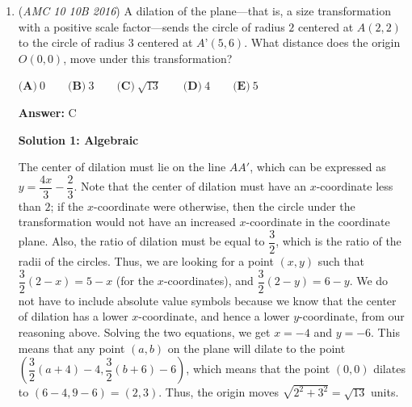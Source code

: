 \begin{enumerate}
We set the points$D(0, 0)$, $A(0, 4)$, $E(4, 4)$, $B(5, 4)$, $G(5, 1)$, $C(5, 0)$, and $F(2, 0)$.The equation of $\overline{AC}$ is $y=-\frac{4}{5}x+4$, the equation of $\overline{AG}$ is $y=-\frac{3}{5}x+4$, and the equation of $\overline{EF}$ is $y=2x-4$. Solving the system of equations for $\overline{AC}$ and $\overline{EF}$ to find point $P$, $y=-\frac{4}{5}x+4=2x-4 \longrightarrow \frac{14}{5}x=8 \longrightarrow x=\frac{20}{7}$ and $y=2x-4=\frac{12}{7}$. So the coordinate of point P is $P(\frac{20}{7}, \frac{12}{7})$. Next find point Q by solving the system of equations for $\overline{AG}$ and $\overline{EF}$ to get $Q(\frac{40}{13}, \frac{28}{13})$. Using the distance formula, 
 \[PQ=\sqrt{\left(\frac{40}{13}-\frac{20}{7}\right)^{2}+\left(\frac{28}{13}-\frac{12}{7}\right)^{2}}=\sqrt{\left(\frac{20}{91}\right)^{2}+\left(\frac{40}{91}\right)^{2}}\]
 \[=\sqrt{\frac{400}{8281}+\frac{1600}{8281}}=\sqrt{\frac{2000}{8281}}=\frac{20\sqrt{5}}{91}\] Also using the distance formula, 
 \[EF=\sqrt{\left(4-2\right)^{2}+\left(4-0\right)^{2}}=\sqrt{4+16}=\sqrt{20}=2\sqrt{5}\] Finally, 
 \[\frac{PQ}{EF}=\frac{\frac{20\sqrt{5}}{91}}{2\sqrt{5}}=\frac{10}{91} \Longrightarrow \boxed{\textbf{(D)}~\frac{10}{91}}\]~JH. L

 


	\item (\textit{AMC 10 10B 2016}) A dilation of the plane—that is, a size transformation with a positive scale factor—sends the circle of radius $2$ centered at $A(2,2)$ to the circle of radius $3$ centered at $A’(5,6)$. What distance does the origin $O(0,0)$, move under this transformation?


 $\textbf{(A)}\ 0\qquad\textbf{(B)}\ 3\qquad\textbf{(C)}\ \sqrt{13}\qquad\textbf{(D)}\ 4\qquad\textbf{(E)}\ 5$

 \textbf{Answer: }C



\textbf{Solution 1: Algebraic}

The center of dilation must lie on the line $A A'$, which can be expressed as $y = \dfrac{4x}{3} - \dfrac{2}{3}$. Note that the center of dilation must have an $x$-coordinate less than $2$; if the $x$-coordinate were otherwise, then the circle under the transformation would not have an increased $x$-coordinate in the coordinate plane. Also, the ratio of dilation must be equal to $\dfrac{3}{2}$, which is the ratio of the radii of the circles. Thus, we are looking for a point $(x,y)$ such that $\dfrac{3}{2} \left( 2 - x \right) = 5 - x$ (for the $x$-coordinates), and $\dfrac{3}{2} \left( 2 - y \right) = 6 - y$. We do not have to include absolute value symbols because we know that the center of dilation has a lower $x$-coordinate, and hence a lower $y$-coordinate, from our reasoning above. Solving the two equations, we get $x = -4$ and $y = - 6$. This means that any point $(a,b)$ on the plane will dilate to the point $\left( \dfrac{3}{2} (a + 4) - 4, \dfrac{3}{2} (b + 6) - 6 \right)$, which means that the point $(0,0)$ dilates to $\left( 6 - 4, 9 - 6 \right) = (2,3)$. Thus, the origin moves $\sqrt{2^2 + 3^2} = \boxed{\sqrt{13}}$ units.


\end{enumerate}
